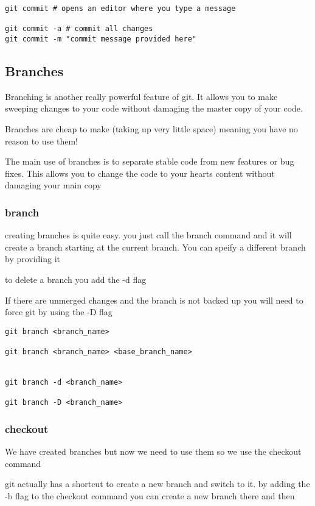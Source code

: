 \documentclass[a4paper]{article}
\begin{document}
\begin{verbatim}
git commit # opens an editor where you type a message

git commit -a # commit all changes
git commit -m "commit message provided here"
\end{verbatim}
\subsection*{Branches}
\label{sec:orgc5eecf3}
\begin{notes}
	Branching is another really powerful feature of git. It allows you to make
	sweeping changes to your code without damaging the master copy of your code.

	Branches are cheap to make (taking up very little space) meaning you have no
	reason to use them!

	The main use of branches is to separate stable code from new features or bug
	fixes. This allows you to change the code to your hearts content without
	damaging your main copy
\end{notes}
\subsubsection*{branch}
\label{sec:org31454ae}
\begin{notes}
	creating branches is quite easy. you just call the branch command and it will
	create a branch starting at the current branch. You can speify a different
	branch by providing it

	to delete a branch you add the -d flag

	If there are unmerged changes and the branch is not backed up you will need to
	force git by using the -D flag
\end{notes}

\begin{verbatim}
git branch <branch_name>

git branch <branch_name> <base_branch_name>


git branch -d <branch_name>

git branch -D <branch_name>
\end{verbatim}
\subsubsection*{checkout}
\label{sec:org971b1e7}
\begin{notes}
	We have created branches but now we need to use them so we use the checkout
	command

	git actually has a shortcut to create a new branch and switch to it. by adding
	the -b flag to the checkout command you can create a new branch there and then
\end{notes}
\end{document}
